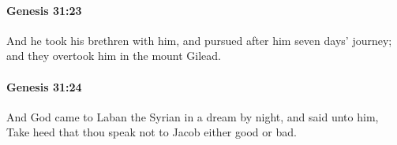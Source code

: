 		\paragraph{Genesis 31:23} %
			\label{GENESIS-31-23}

			And he took his brethren with him, and pursued after him seven days' journey; and they overtook him in the mount Gilead.


		\paragraph{Genesis 31:24} %
			\label{GENESIS-31-24}

			And God came to Laban the Syrian in a dream by night, and said unto him, Take heed that thou speak not to Jacob either good or bad.


